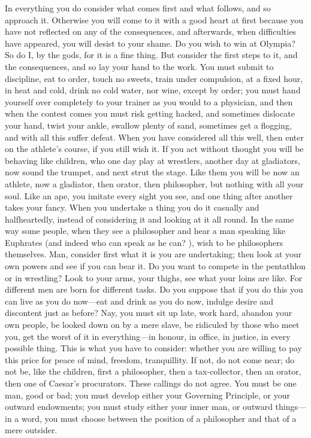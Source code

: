 In  everything you  do  consider what  comes  first and  what  follows, and  so
approach it. Otherwise you  will come to it with a good  heart at first because
you  have not  reflected  on  any of  the  consequences,  and afterwards,  when
difficulties have appeared, you  will desist to your shame. Do  you wish to win
at Olympia?  So do I,  by the gods,  for it is a  fine thing. But  consider the
first steps to it, and the consequences, and  so lay your hand to the work. You
must  submit  to  discipline,  eat  to order,  touch  no  sweets,  train  under
compulsion, at a fixed  hour, in heat and cold, drink no  cold water, nor wine,
except by order; you must hand yourself  over completely to your trainer as you
would to  a physician, and  then when the contest  comes you must  risk getting
hacked, and sometimes dislocate your hand,  twist your ankle, swallow plenty of
sand, sometimes get a flogging, and with  all this suffer defeat. When you have
considered all this well, then enter on the athlete's course, if you still wish
it. If you act without thought you  will be behaving like children, who one day
play at wrestlers,  another day at gladiators, now sound  the trumpet, and next
strut the stage.  Like them you will  be now an athlete, now  a gladiator, then
orator, then  philosopher, but  nothing with  all your soul.  Like an  ape, you
imitate every sight you see, and one thing after another takes your fancy. When
you  undertake  a thing  you  do  it  casually  and halfheartedly,  instead  of
considering it and looking  at it all round. In the same  way some people, when
they see a philosopher  and hear a man speaking like  Euphrates (and indeed who
can speak as he can? ), wish to be philosophers themselves. Man, consider first
what it is you are undertaking; then look at your own powers and see if you can
bear it. Do you want to compete in the pentathlon or in wrestling? Look to your
arms, your thighs, see what your loins are like. For different men are born for
different tasks.  Do you suppose  that if you  do this you  can live as  you do
now---eat  and drink  as you  do  now, indulge  desire and  discontent just  as
before? Nay,  you must  sit up  late, work  hard, abandon  your own  people, be
looked down  on by a mere  slave, be ridiculed by  those who meet you,  get the
worst of it in everything---in honour, in office, in justice, in every possible
thing. This is what  you have to consider: whether you are  willing to pay this
price for peace  of mind, freedom, tranquillity.  If not, do not  come near; do
not be, like  the children, first a philosopher, then  a tax-collector, then an
orator, then one of Caesar's procurators. These callings do not agree. You must
be one man, good  or bad; you must develop either  your Governing Principle, or
your  outward endowments;  you must  study either  your inner  man, or  outward
things---in a word,  you must choose between the position  of a philosopher and
that of a mere outsider.
